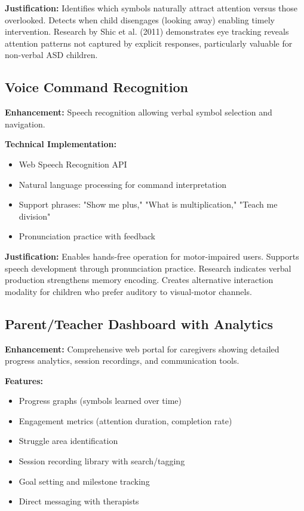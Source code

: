 \documentclass[11pt, a4paper]{article}
\begin{document}
\textbf{Justification:} Identifies which symbols naturally attract attention versus those overlooked. Detects when child disengages (looking away) enabling timely intervention. Research by Shic et al. (2011) demonstrates eye tracking reveals attention patterns not captured by explicit responses, particularly valuable for non-verbal ASD children.

\subsection{Voice Command Recognition}

\textbf{Enhancement:} Speech recognition allowing verbal symbol selection and navigation.

\textbf{Technical Implementation:}
\begin{itemize}[leftmargin=*, noitemsep]
    \item Web Speech Recognition API
    \item Natural language processing for command interpretation
    \item Support phrases: "Show me plus," "What is multiplication," "Teach me division"
    \item Pronunciation practice with feedback
\end{itemize}

\textbf{Justification:} Enables hands-free operation for motor-impaired users. Supports speech development through pronunciation practice. Research indicates verbal production strengthens memory encoding. Creates alternative interaction modality for children who prefer auditory to visual-motor channels.

\subsection{Parent/Teacher Dashboard with Analytics}

\textbf{Enhancement:} Comprehensive web portal for caregivers showing detailed progress analytics, session recordings, and communication tools.

\textbf{Features:}
\begin{itemize}[leftmargin=*, noitemsep]
    \item Progress graphs (symbols learned over time)
    \item Engagement metrics (attention duration, completion rate)
    \item Struggle area identification
    \item Session recording library with search/tagging
    \item Goal setting and milestone tracking
    \item Direct messaging with therapists
\end{itemize}
\end{document}
